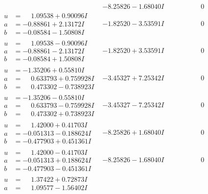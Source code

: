\documentclass[1p]{elsarticle_modified}
\theoremstyle{definition}
\begin{document}
$$\begin{array}{c|c|c}
 & -8.25826 - 1.68040 I & \phantom{-0.000000 } 0 \\ \hline\begin{aligned}
u &= \phantom{-}1.09538 + 0.90096 I \\
a &= -0.88861 + 2.13172 I \\
b &= -0.08584 - 1.50808 I\end{aligned}
 & -1.82520 - 3.53591 I & \phantom{-0.000000 } 0 \\ \hline\begin{aligned}
u &= \phantom{-}1.09538 - 0.90096 I \\
a &= -0.88861 - 2.13172 I \\
b &= -0.08584 + 1.50808 I\end{aligned}
 & -1.82520 + 3.53591 I & \phantom{-0.000000 } 0 \\ \hline\begin{aligned}
u &= -1.35206 + 0.55810 I \\
a &= \phantom{-}0.633793 + 0.759928 I \\
b &= \phantom{-}0.473302 - 0.738923 I\end{aligned}
 & -3.45327 + 7.25342 I & \phantom{-0.000000 } 0 \\ \hline\begin{aligned}
u &= -1.35206 - 0.55810 I \\
a &= \phantom{-}0.633793 - 0.759928 I \\
b &= \phantom{-}0.473302 + 0.738923 I\end{aligned}
 & -3.45327 - 7.25342 I & \phantom{-0.000000 } 0 \\ \hline\begin{aligned}
u &= \phantom{-}1.42000 + 0.41703 I \\
a &= -0.051313 - 0.188624 I \\
b &= -0.477903 + 0.451361 I\end{aligned}
 & -8.25826 + 1.68040 I & \phantom{-0.000000 } 0 \\ \hline\begin{aligned}
u &= \phantom{-}1.42000 - 0.41703 I \\
a &= -0.051313 + 0.188624 I \\
b &= -0.477903 - 0.451361 I\end{aligned}
 & -8.25826 - 1.68040 I & \phantom{-0.000000 } 0 \\ \hline\begin{aligned}
u &= \phantom{-}1.37422 + 0.72873 I \\
a &= \phantom{-}1.09577 - 1.56402 I \\

\end{aligned}
\end{array}$$
\end{document}
